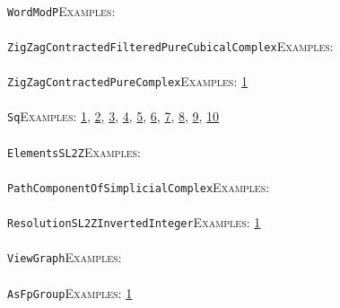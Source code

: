 \documentclass[a4paper,11pt]{report}
\begin{document}
{{ \\
 \texttt{WordModP}{\nobreakspace}{\nobreakspace}{\nobreakspace}{\nobreakspace}\textsc{Examples:} \\
 \\
 \texttt{ZigZagContractedFilteredPureCubicalComplex}{\nobreakspace}{\nobreakspace}{\nobreakspace}{\nobreakspace}\textsc{Examples:} \\
 \\
 \texttt{ZigZagContractedPureComplex}{\nobreakspace}{\nobreakspace}{\nobreakspace}{\nobreakspace}\textsc{Examples:} \href{../www/SideLinks/About/aboutPeripheral.html} {1}{\nobreakspace} \\
 \\
 \texttt{Sq}{\nobreakspace}{\nobreakspace}{\nobreakspace}{\nobreakspace}\textsc{Examples:} \href{tutorial/chap7.html} {1}{\nobreakspace}, \href{tutorial/chap10.html} {2}{\nobreakspace}, \href{../www/SideLinks/About/aboutArtinGroups.html} {3}{\nobreakspace}, \href{../www/SideLinks/About/aboutModPRings.html} {4}{\nobreakspace}, \href{../www/SideLinks/About/aboutAspherical.html} {5}{\nobreakspace}, \href{../www/SideLinks/About/aboutNonabelian.html} {6}{\nobreakspace}, \href{../www/SideLinks/About/aboutQuandles2.html} {7}{\nobreakspace}, \href{../www/SideLinks/About/aboutKnots.html} {8}{\nobreakspace}, \href{../www/SideLinks/About/aboutTensorSquare.html} {9}{\nobreakspace}, \href{../www/SideLinks/About/aboutKnotsQuandles.html} {10}{\nobreakspace} \\
 \\
 \texttt{ElementsSL2Z}{\nobreakspace}{\nobreakspace}{\nobreakspace}{\nobreakspace}\textsc{Examples:} \\
 \\
 \texttt{PathComponentOfSimplicialComplex}{\nobreakspace}{\nobreakspace}{\nobreakspace}{\nobreakspace}\textsc{Examples:} \\
 \\
 \texttt{ResolutionSL2ZInvertedInteger}{\nobreakspace}{\nobreakspace}{\nobreakspace}{\nobreakspace}\textsc{Examples:} \href{tutorial/chap10.html} {1}{\nobreakspace} \\
 \\
 \texttt{ViewGraph}{\nobreakspace}{\nobreakspace}{\nobreakspace}{\nobreakspace}\textsc{Examples:} \\
 \\
 \texttt{AsFpGroup}{\nobreakspace}{\nobreakspace}{\nobreakspace}{\nobreakspace}\textsc{Examples:} \href{tutorial/chap10.html} {1}{\nobreakspace} \\
 \\
}}
\end{document}
